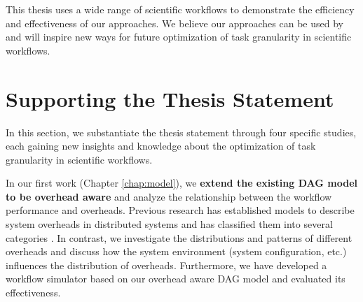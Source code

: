 This thesis uses a wide range of scientific workflows to demonstrate the efficiency and effectiveness of our approaches. 
We believe our approaches can be used by and will inspire new ways for future optimization of task granularity in scientific workflows. 



\section{Supporting the Thesis Statement}

In this section, we substantiate the thesis statement through four specific studies, each gaining new insights and knowledge about the optimization of task granularity in scientific workflows. 

In our first work \cite{Chen2011} (Chapter \ref{chap:model}), we \textbf{extend the existing DAG model to be overhead aware} and analyze the relationship between the workflow performance and overheads. Previous research has established models to describe system overheads in distributed systems and has classified them into several categories \cite{Prodan2007, Prodan2008}. In contrast, we investigate the distributions and patterns of different overheads and discuss how the system environment (system configuration, etc.) influences the distribution of overheads. Furthermore, we have developed a workflow simulator based on our overhead aware DAG model and evaluated its effectiveness. 

